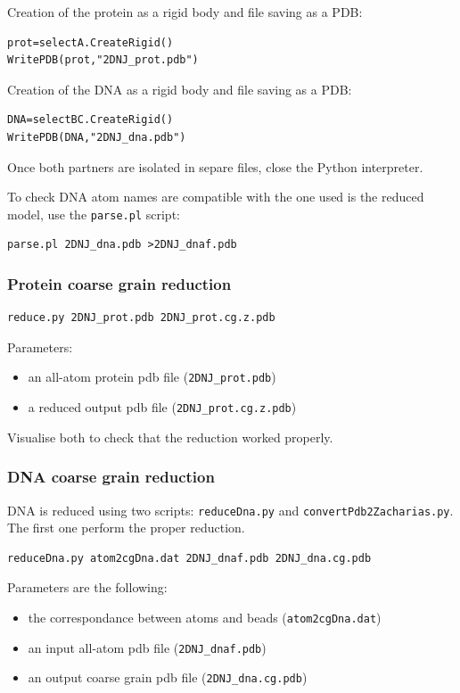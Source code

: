 \documentclass[12pt,a4paper]{article}
\begin{document}
Creation of the protein as a rigid body and file saving as a PDB:
\begin{verbatim}
prot=selectA.CreateRigid()
WritePDB(prot,"2DNJ_prot.pdb")
\end{verbatim}

Creation of the DNA as a rigid body and file saving as a PDB:
\begin{verbatim}
DNA=selectBC.CreateRigid()
WritePDB(DNA,"2DNJ_dna.pdb")
\end{verbatim}

Once both partners are isolated in separe files, close the Python interpreter.

To check DNA atom names are compatible with the one used is the reduced model, use the {\tt parse.pl} script:
\begin{verbatim}
parse.pl 2DNJ_dna.pdb >2DNJ_dnaf.pdb
\end{verbatim}

\subsubsection{Protein coarse grain reduction}

\begin{verbatim}
reduce.py 2DNJ_prot.pdb 2DNJ_prot.cg.z.pdb
\end{verbatim}

Parameters:
\begin{itemize}
\item an all-atom protein pdb file ({\tt 2DNJ\_prot.pdb})
\item a reduced output pdb file ({\tt 2DNJ\_prot.cg.z.pdb})
\end{itemize}

Visualise both to check that the reduction worked properly.

\subsubsection{DNA coarse grain reduction}

DNA is reduced using two scripts: {\tt reduceDna.py} and {\tt convertPdb2Zacharias.py}. The first one perform the proper reduction.
\begin{verbatim}
reduceDna.py atom2cgDna.dat 2DNJ_dnaf.pdb 2DNJ_dna.cg.pdb
\end{verbatim}
Parameters are the following:
\begin{itemize}
\item the correspondance between atoms and beads ({\tt atom2cgDna.dat})
\item an input all-atom pdb file ({\tt 2DNJ\_dnaf.pdb})
\item an output coarse grain pdb file ({\tt 2DNJ\_dna.cg.pdb})
\end{itemize}
\end{document}

